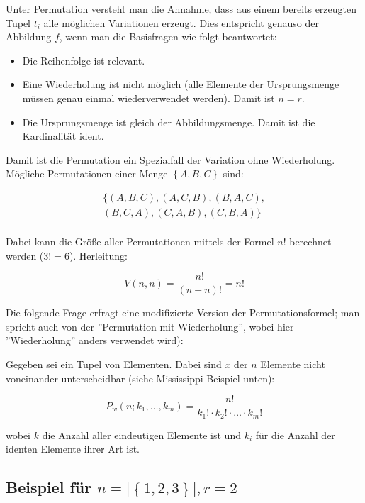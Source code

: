 \documentclass[a4paper,twocolumn]{article}
\newcommand{\set}[1]{\left\{#1\right\}}
\newcommand{\tuple}[1]{\left(#1\right)}
\begin{document}
Unter Permutation versteht man die Annahme, dass aus einem bereits erzeugten
Tupel $t_i$ alle möglichen Variationen erzeugt. Dies entspricht genauso
der Abbildung $f$, wenn man die Basisfragen wie folgt beantwortet:

\begin{itemize}
  \item Die Reihenfolge ist relevant.
  \item Eine Wiederholung ist nicht möglich (alle Elemente der
        Ursprungsmenge müssen genau einmal wiederverwendet werden).
        Damit ist $n=r$.
  \item Die Ursprungsmenge ist gleich der Abbildungsmenge. Damit ist
        die Kardinalität ident.
\end{itemize}

Damit ist die Permutation ein Spezialfall der Variation ohne Wiederholung.
Mögliche Permutationen einer Menge $\set{A, B, C}$ sind:

\[
    \begin{array}{c}
      \{\tuple{A, B, C}, \tuple{A, C, B}, \tuple{B, A, C}, \\
        \tuple{B, C, A}, \tuple{C, A, B}, \tuple{C, B, A}\} \\
    \end{array}
\]

Dabei kann die Größe aller Permutationen mittels der Formel $n!$ berechnet
werden ($3! = 6$). Herleitung:

\[
    V(n, n) = \frac{n!}{(n-n)!} = n!
\]

Die folgende Frage erfragt eine modifizierte Version
der Permutationsformel; man spricht auch von der ''Permutation mit
Wiederholung'', wobei hier ''Wiederholung'' anders verwendet wird):

Gegeben sei ein Tupel von Elementen. Dabei sind $x$ der $n$ Elemente nicht
voneinander unterscheidbar (siehe Mississippi-Beispiel unten):

\[
    P_w(n; k_1, \ldots, k_m)
        = \frac{n!}{k_1! \cdot k_2! \cdot \ldots \cdot k_m!}
\]

wobei $k$ die Anzahl aller eindeutigen Elemente ist und $k_i$ für die Anzahl
der identen Elemente ihrer Art ist.

\subsection{Beispiel für $n=|\set{1,2,3}|, r=2$}
\end{document}
